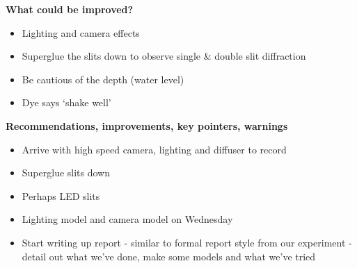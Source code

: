 \textbf{What could be improved?}

\begin{itemize}
\item Lighting and camera effects
\item Superglue the slits down to observe single \& double slit diffraction
\item Be cautious of the depth (water level)
\item Dye says `shake well'
\end{itemize}

\bigskip


\textbf{Recommendations, improvements, key pointers, warnings}

\begin{itemize}
\item Arrive with high speed camera, lighting and diffuser to record
\item Superglue slits down
\item Perhaps LED slits
\item Lighting model and camera model on Wednesday
\item Start writing up report - similar to formal report style from our experiment - detail out what we've done, make some models and what we've tried
\end{itemize}

